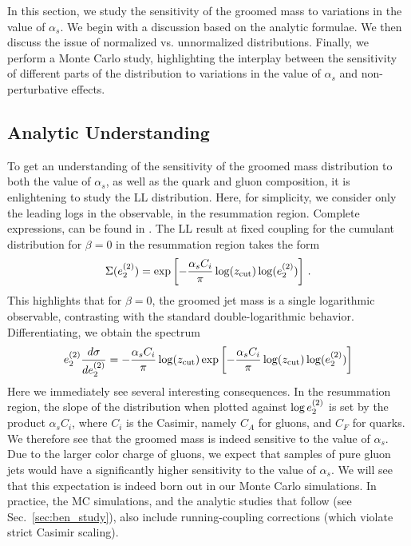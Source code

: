 
In this section, we study the sensitivity of the groomed mass to variations in the value of $\alpha_s$. We begin with a discussion based on the analytic formulae. We then discuss the issue of normalized vs. unnormalized distributions. Finally, we perform a Monte Carlo study, highlighting the interplay between the sensitivity of different parts of the distribution to variations in the value of $\alpha_s$ and non-perturbative effects.


\subsection{Analytic Understanding}\label{sec:analytic}

To get an understanding of the sensitivity of the groomed mass distribution to both the value of $\alpha_s$, as well as the quark and gluon composition, it is enlightening to study the LL distribution. Here, for simplicity, we consider only the leading logs in the observable, in the resummation region. Complete expressions, can be found in \cite{Larkoski:2014wba,Frye:2016aiz,Marzani:2017kqd,Marzani:2017mva}. The LL result at fixed coupling for the cumulant distribution for $\beta=0$ in the resummation region takes the form
\begin{align}
\Sigma(e_{2}^{(2)})=\exp\left[ - \frac{\alpha_s C_i}{\pi} \log(z_{\rm cut}) \log (e_{2}^{(2)}) \right]\,.
\end{align}
This highlights that for $\beta=0$, the groomed
  jet mass is a single logarithmic observable, contrasting with the
  standard double-logarithmic behavior.  Differentiating, we obtain
  the spectrum
\begin{align}
e_{2}^{(2)}  \frac{d\sigma}{d e_{2}^{(2)}}=   - \frac{\alpha_s C_i}{\pi} \log(z_{\rm cut})   \exp\left[ - \frac{\alpha_s C_i}{\pi}  \log(z_{\rm cut}) \log (e_{2}^{(2)}) \right]
\end{align}
Here we immediately see several interesting consequences. In the resummation region, the slope of the distribution when plotted against $\log e_{2}^{(2)}$ is set by the product $\alpha_s C_i$, where $C_i$ is the Casimir, namely $C_A$ for gluons, and $C_F$ for quarks. We therefore see that the groomed mass is indeed sensitive to the value of $\alpha_s$. Due to the larger color charge of gluons, we expect that samples of pure gluon jets would have a significantly higher sensitivity to the value of $\alpha_s$.  We will see that this expectation is indeed born out in our Monte Carlo simulations.   In practice, the MC simulations, and the analytic studies that follow (see Sec.~\ref{sec:ben_study}), also include running-coupling corrections (which violate strict Casimir scaling).

